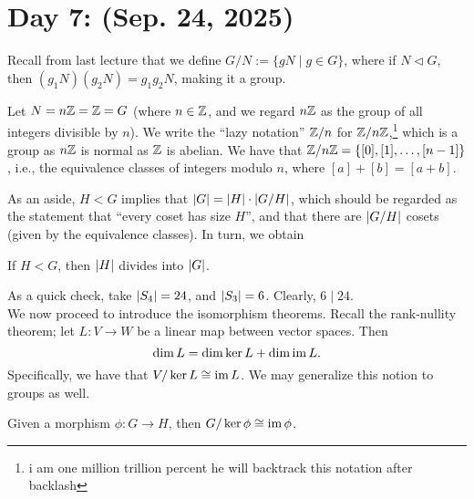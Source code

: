 \section{Day 7: (Sep. 24, 2025)}
Recall from last lecture that we define $G/N := \{gN \mid g \in G\}$, where if $N \lhd G$, then $(g_1N)(g_2N) = g_1g_2N$, making it a group.
\begin{example}
    Let $N = n\mathbb Z = \mathbb Z = G$ (where $n \in \mathbb Z$, and we regard $n\mathbb Z$ as the group of all integers divisible by $n$). We write the ``lazy notation'' $\mathbb Z/n$ for $\mathbb Z/n\mathbb Z$,\footnote{i am one million trillion percent he will backtrack this notation after backlash} which is a group as $n\mathbb Z$ is normal as $\mathbb Z$ is abelian. We have that $\mathbb Z/n\mathbb Z = \{[0], [1], \dots, [n-1]\}$, i.e., the equivalence classes of integers modulo $n$, where $[a] + [b] = [a + b]$.
\end{example}
\noindent As an aside, $H < G$ implies that $\left\lvert G \right\rvert = \left\lvert H \right\rvert \cdot \left\lvert G/H \right\rvert$, which should be regarded as the statement that ``every coset has size $H$'', and that there are $\left\lvert G/H \right\rvert$ cosets (given by the equivalence classes). In turn, we obtain
\begin{theorem}
    If $H < G$, then $\left\lvert H \right\rvert$ divides into $\left\lvert G \right\rvert$.
\end{theorem}
\noindent As a quick check, take $\left\lvert S_4 \right\rvert = 24$, and $\left\lvert S_3 \right\rvert = 6$. Clearly, $6 \mid 24$.
\\[8pt]
We now proceed to introduce the isomorphism theorems. Recall the rank-nullity theorem; let $L : V \to W$ be a linear map between vector spaces. Then
\[ \dim L = \dim \ker L + \dim \operatorname{im} L. \]
Specifically, we have that $V/\ker L \cong \operatorname{im} L$. We may generalize this notion to groups as well.
\begin{theorem}
    Given a morphism $\phi : G \to H$, then $G/\ker \phi \cong \operatorname{im} \phi$.
\end{theorem}
